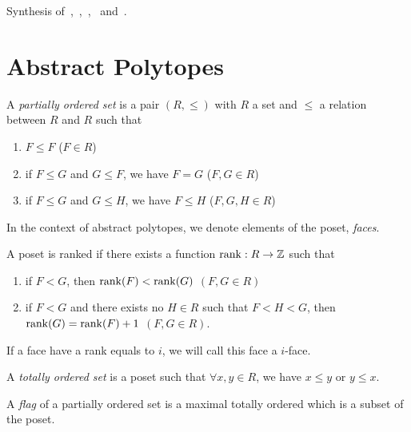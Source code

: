 Synthesis of~\cite{highestRankOfAn},~\cite{A12PolytopesRank},~\cite{highRankAlternating},~\cite{bookIncidenceGeometry} and~\cite{cprGraph}.

\section{Abstract Polytopes}

\begin{definition}
  A \textit{partially ordered set} is a pair $(R,\le)$ with $R$ a set and $\le$ a relation between $R$ and $R$ such that
  \begin{enumerate}
    \item $F \le F$ ($F \in R$)
    \item if $F \le G$ and $G \le F$, we have $F=G$ ($F,G \in R$)
    \item if $F \le G$ and $G \le H$, we have $F \le H$ ($F,G,H \in R$)
  \end{enumerate}
\end{definition}

\begin{definition}
  In the context of abstract polytopes, we denote elements of the poset, \textit{faces}.
\end{definition}

\begin{definition}
  A poset is ranked if there exists a function $\operatorname{rank} : R \to \mathbb Z$ such that
  \begin{enumerate}
    \item if $F < G$, then $\operatorname{rank}(F) < \operatorname{rank}(G)$ $(F, G \in R)$
    \item if $F < G$ and there exists no $H \in R$ such that $F < H < G$, then $\operatorname{rank}(G) = \operatorname{rank}(F) + 1$ $(F, G \in R)$.
  \end{enumerate}
\end{definition}

\begin{definition}[$i$-face]
  If a face have a rank equals to $i$, we will call this face a $i$-face.
\end{definition}

\begin{definition}
  A \textit{totally ordered set} is a poset such that $\forall x,y \in R$, we have $x \le y$ or $y \le x$.
\end{definition}

\begin{definition}
  A \textit{flag} of a partially ordered set is a maximal totally ordered which is a subset of the poset.
\end{definition}

